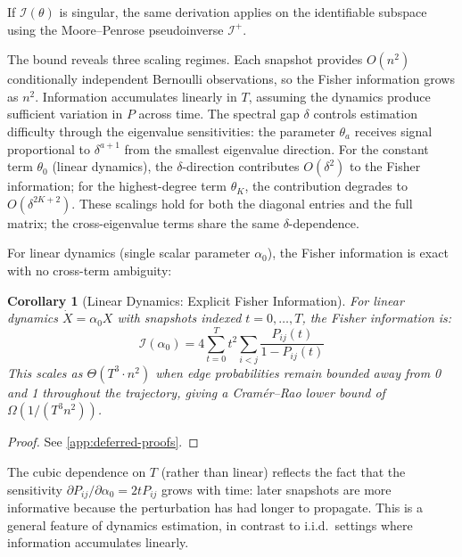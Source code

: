 \documentclass{article}
\theoremstyle{plain}
\newtheorem{corollary}{Corollary}
\theoremstyle{definition}
\theoremstyle{remark}
\begin{document}
If $\mathcal{I}(\theta)$ is singular, the same derivation applies on the identifiable subspace using the Moore--Penrose pseudoinverse $\mathcal{I}^+$.

The bound reveals three scaling regimes.
Each snapshot provides $O(n^2)$ conditionally independent Bernoulli observations, so the Fisher information grows as $n^2$.
Information accumulates linearly in $T$, assuming the dynamics produce sufficient variation in $P$ across time.
The spectral gap $\delta$ controls estimation difficulty through the eigenvalue sensitivities: the parameter $\theta_a$ receives signal proportional to $\delta^{a+1}$ from the smallest eigenvalue direction.
For the constant term $\theta_0$ (linear dynamics), the $\delta$-direction contributes $O(\delta^2)$ to the Fisher information; for the highest-degree term $\theta_K$, the contribution degrades to $O(\delta^{2K+2})$.
These scalings hold for both the diagonal entries and the full matrix; the cross-eigenvalue terms share the same $\delta$-dependence.

For linear dynamics (single scalar parameter $\alpha_0$), the Fisher information is exact with no cross-term ambiguity:

\begin{corollary}[Linear Dynamics: Explicit Fisher Information]\label{cor:linear-fisher}
For linear dynamics $\dot{X} = \alpha_0 X$ with snapshots indexed $t=0, \ldots, T$, the Fisher information is:
\begin{equation}
\mathcal{I}(\alpha_0) = 4 \sum_{t=0}^T t^2 \sum_{i < j} \frac{P_{ij}(t)}{1 - P_{ij}(t)}
\end{equation}
This scales as $\Theta(T^3 \cdot n^2)$ when edge probabilities remain bounded away from 0 and 1 throughout the trajectory, giving a Cram\'er--Rao lower bound of $\Omega(1/(T^3 n^2))$.
\end{corollary}

\begin{proof}
See \cref{app:deferred-proofs}.
\end{proof}

The cubic dependence on $T$ (rather than linear) reflects the fact that the sensitivity $\partial P_{ij} / \partial \alpha_0 = 2 t P_{ij}$ grows with time: later snapshots are more informative because the perturbation has had longer to propagate.
This is a general feature of dynamics estimation, in contrast to i.i.d.\ settings where information accumulates linearly.
\end{document}
